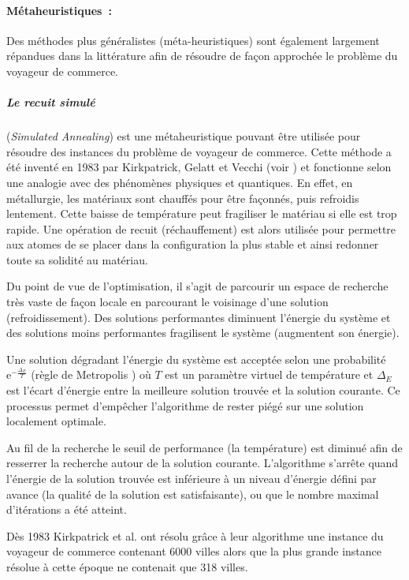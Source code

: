 \paragraph{Métaheuristiques~:}
\label{sec:tsp:resolution:approchee:metaheuristique}
Des méthodes plus généralistes (méta-heuristiques) sont également largement répandues dans la littérature afin de résoudre de façon approchée le problème du voyageur de commerce.

\subparagraph{Le recuit simulé} (\textit{Simulated Annealing}) est une métaheuristique pouvant être utilisée pour résoudre des instances du problème de voyageur de commerce. 
Cette méthode a été inventé en 1983 par Kirkpatrick, Gelatt et Vecchi (voir \cite{Kirkpatrick1983}) et fonctionne selon une analogie avec des phénomènes physiques et quantiques. En effet, en métallurgie, les matériaux sont chauffés pour être façonnés, puis refroidis lentement. Cette baisse de température peut fragiliser le matériau si elle est trop rapide. Une opération de recuit (réchauffement) est alors utilisée pour permettre aux atomes de se placer dans la configuration la plus stable et ainsi redonner toute sa solidité au matériau.

Du point de vue de l'optimisation, il s'agit de parcourir un espace de recherche très vaste de façon locale en parcourant le voisinage d'une solution (refroidissement). Des solutions performantes diminuent l'énergie du système et des solutions moins performantes fragilisent le système (augmentent son énergie).

Une solution dégradant l'énergie du système est acceptée selon une probabilité $\mathrm{e}^{-\frac{\Delta_E}{T}}$ (règle de Metropolis \cite{Metropolis1953}) où $T$ est un paramètre virtuel de température et $\Delta_E$ est l'écart d'énergie entre la meilleure solution trouvée et la solution courante. Ce processus permet d'empêcher l'algorithme de rester piégé sur une solution localement optimale.

Au fil de la recherche le seuil de performance (la température) est diminué afin de resserrer la recherche autour de la solution courante. L'algorithme s’arrête quand l'énergie de la solution trouvée est inférieure à un niveau d'énergie défini par avance (la qualité de la solution est satisfaisante), ou que le nombre maximal d'itérations a été atteint.

Dès 1983 Kirkpatrick et al. ont résolu grâce à leur algorithme une instance du voyageur de commerce contenant 6000 villes alors que la plus grande instance résolue à cette époque ne contenait que 318 villes.

